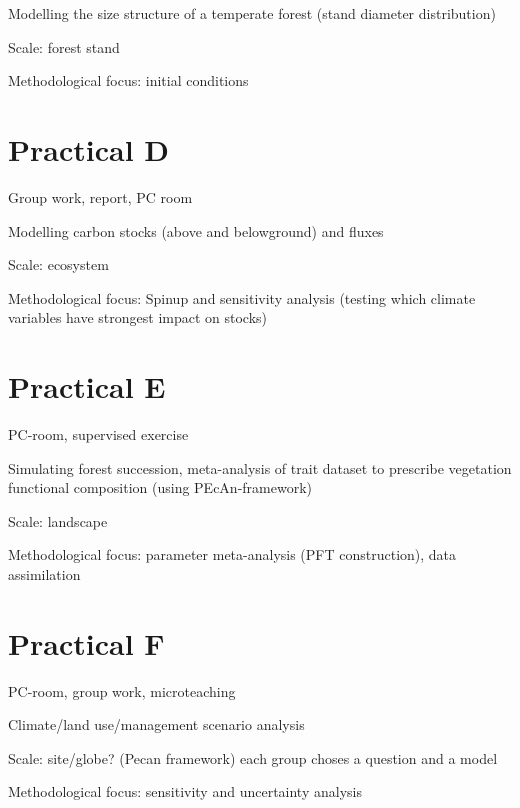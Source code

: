 \documentclass[12pt,oneside]{book}
\begin{document}
Modelling the size structure of a temperate forest (stand diameter
distribution)

Scale: forest stand

Methodological focus: initial conditions

\chapter*{Practical D}\label{practical-d}

Group work, report, PC room

Modelling carbon stocks (above and belowground) and fluxes

Scale: ecosystem

Methodological focus: Spinup and sensitivity analysis (testing which
climate variables have strongest impact on stocks)

\chapter*{Practical E}\label{practical-e}

PC-room, supervised exercise

Simulating forest succession, meta-analysis of trait dataset to
prescribe vegetation functional composition (using PEcAn-framework)

Scale: landscape

Methodological focus: parameter meta-analysis (PFT construction), data
assimilation

\chapter*{Practical F}\label{practical-f}

PC-room, group work, microteaching

Climate/land use/management scenario analysis

Scale: site/globe? (Pecan framework) each group choses a question and a
model

Methodological focus: sensitivity and uncertainty analysis


\end{document}
